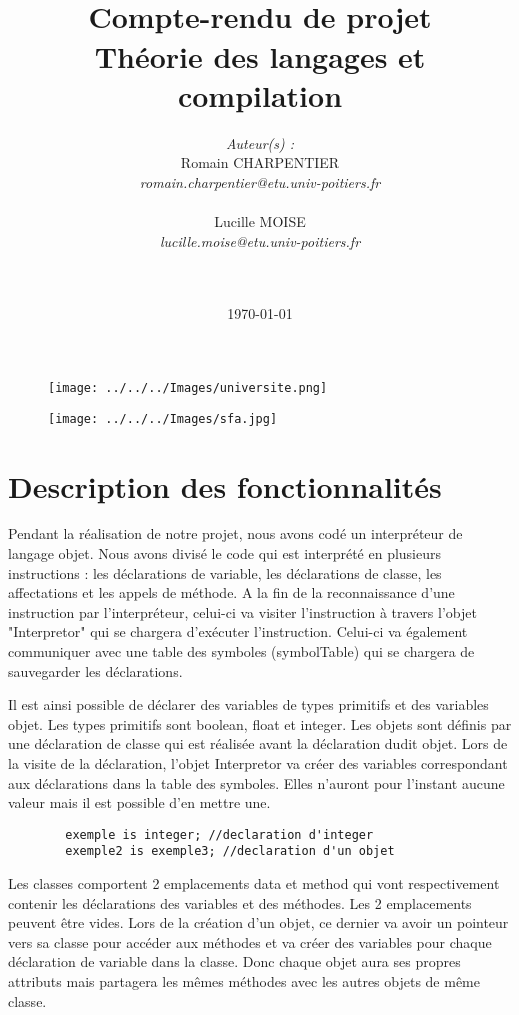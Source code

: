 \documentclass{report}
\title{
	\noindent\hrulefill\\
	\vspace{0.4\baselineskip}	%
	Compte-rendu de projet\\
	{\large Théorie des langages et compilation}\\
	\noindent\hrulefill
	\vspace{2\baselineskip}
}
\author{
	\textit{Auteur(s) :}\\
	Romain CHARPENTIER\\
	\textit{romain.charpentier@etu.univ-poitiers.fr}\\\\
	Lucille MOISE\\
	\textit{lucille.moise@etu.univ-poitiers.fr}\\\\\\
}
\date{\today}
\begin{document}
\lstset{language=C++}
	\begin{figure}
	\vspace{5\baselineskip}
   	 \begin{minipage}[c]{.3\linewidth}
   	     \centering
   	     \texttt{[image: ../../../Images/universite.png]} 
 	   \end{minipage}
  	  \hfill
  	  \begin{minipage}[c]{.3\linewidth}
   	     \centering
    	    \texttt{[image: ../../../Images/sfa.jpg]}
    	\end{minipage}
	\end{figure}
	\maketitle
	\newpage
	\section{Description des fonctionnalités}
	Pendant la réalisation de notre projet, nous avons codé un interpréteur de langage objet. Nous avons divisé le code qui est interprété en plusieurs instructions : les déclarations de variable, les déclarations de classe, les affectations et les appels de méthode. A la fin de la reconnaissance d'une instruction par l'interpréteur, celui-ci va visiter l'instruction à travers l'objet "Interpretor" qui se chargera d'exécuter l'instruction. Celui-ci va également communiquer avec une table des symboles (symbolTable) qui se chargera de sauvegarder les déclarations.\\
	\par
	Il est ainsi possible de déclarer des variables de types primitifs et des variables objet. Les types primitifs sont boolean, float et integer. Les objets sont définis par une déclaration de classe qui est réalisée avant la déclaration dudit objet. Lors de la visite de la déclaration, l'objet Interpretor va créer des variables correspondant aux déclarations dans la table des symboles. Elles n'auront pour l'instant aucune valeur mais il est possible d'en mettre une.
	\begin{lstlisting}
		exemple is integer; //declaration d'integer
		exemple2 is exemple3; //declaration d'un objet
	\end{lstlisting}
	\par
	Les classes comportent 2 emplacements data et method qui vont respectivement contenir les déclarations des variables et des méthodes. Les 2 emplacements peuvent être vides. Lors de la création d'un objet, ce dernier va avoir un pointeur vers sa classe pour accéder aux méthodes et va créer des variables pour chaque déclaration de variable dans la classe. Donc chaque objet aura ses propres attributs mais partagera les mêmes méthodes avec les autres objets de même classe.
\end{document}
